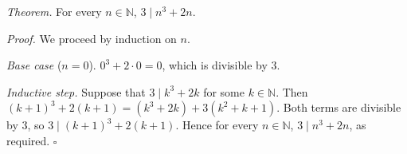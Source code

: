 \textit{Theorem.} For every $n \in \mathbb{N}$, $3 \mid n^{3} + 2n$.

\textit{Proof.} We proceed by induction on $n$.

\textit{Base case} ($n = 0$). $0^{3} + 2 \cdot 0 = 0$, which is divisible by $3$.

\textit{Inductive step.} Suppose that $3 \mid k^{3} + 2k$ for some $k \in \mathbb{N}$.
Then $(k + 1)^{3} + 2(k + 1) = (k^{3} + 2k) + 3(k^{2} + k + 1)$.
Both terms are divisible by $3$, so $3 \mid (k + 1)^{3} + 2(k + 1)$.
Hence for every $n \in \mathbb{N}$, $3 \mid n^{3} + 2n$, as required. \hfill$\square$